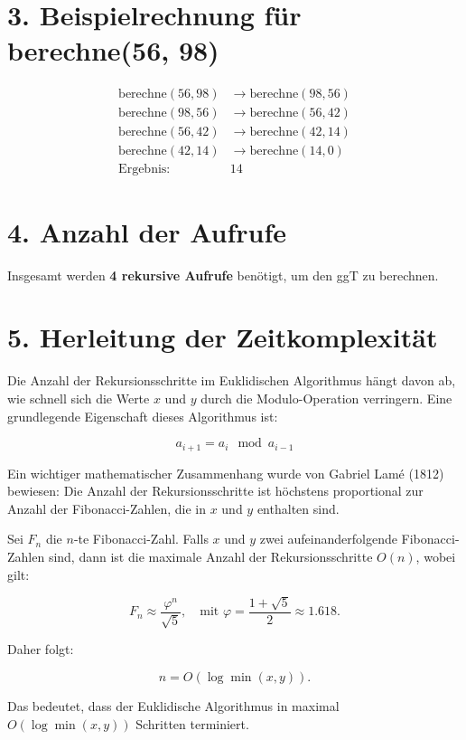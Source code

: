 \documentclass[a4paper,12pt]{article}
\begin{document}
	\section*{3. Beispielrechnung für berechne(56, 98)}
	
	\begin{align*}
		\text{berechne}(56, 98) & \to \text{berechne}(98, 56) \\
		\text{berechne}(98, 56) & \to \text{berechne}(56, 42) \\
		\text{berechne}(56, 42) & \to \text{berechne}(42, 14) \\
		\text{berechne}(42, 14) & \to \text{berechne}(14, 0) \\
		\text{Ergebnis: } & 14
	\end{align*}
	
	\section*{4. Anzahl der Aufrufe}
	
	Insgesamt werden \textbf{4 rekursive Aufrufe} benötigt, um den ggT zu berechnen.
	
	\section*{5. Herleitung der Zeitkomplexität}
	
	Die Anzahl der Rekursionsschritte im Euklidischen Algorithmus hängt davon ab, wie schnell sich die Werte \( x \) und \( y \) durch die Modulo-Operation verringern. Eine grundlegende Eigenschaft dieses Algorithmus ist:
	
	\[ a_{i+1} = a_i \mod a_{i-1} \]
	
	Ein wichtiger mathematischer Zusammenhang wurde von Gabriel Lamé (1812) bewiesen: Die Anzahl der Rekursionsschritte ist höchstens proportional zur Anzahl der Fibonacci-Zahlen, die in \( x \) und \( y \) enthalten sind.
	
	Sei \( F_n \) die \( n \)-te Fibonacci-Zahl. Falls \( x \) und \( y \) zwei aufeinanderfolgende Fibonacci-Zahlen sind, dann ist die maximale Anzahl der Rekursionsschritte \( O(n) \), wobei gilt:
	
	\[ F_n \approx \frac{\varphi^n}{\sqrt{5}}, \quad \text{mit } \varphi = \frac{1 + \sqrt{5}}{2} \approx 1.618. \]
	
	Daher folgt:
	
	\[ n = O(\log \min(x, y)). \]
	
	Das bedeutet, dass der Euklidische Algorithmus in maximal \( O(\log \min(x, y)) \) Schritten terminiert.
	
\end{document}
